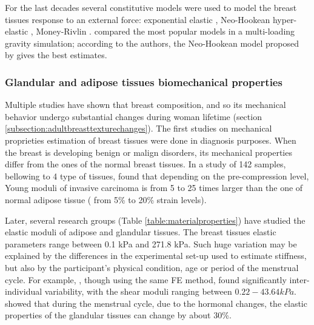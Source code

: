 For the last decades several constitutive models were used to model the breast tissues response to an external force: exponential elastic \citep{azar_methods_2002}, Neo-Hookean hyper-elastic \citep{carter_biomechanical_2009,rajagopal_modeling_2010,sturgeon_finite_element_2016, eiben_breast_2016, han_nonlinear_2014, garcia_mapping_2017}, Money-Rivlin \citep{samani_elastic_2007,tanner_factors_2006,carter_application_2012,martinez_finite_2017}. \cite{eder_comparison_2014} compared the most popular models in a multi-loading gravity simulation; according to the authors, the Neo-Hookean model proposed by \cite{rajagopal_creating_2008} gives the best estimates.

\subsubsection*{Glandular and adipose tissues biomechanical properties }
 Multiple studies have shown that breast composition, and so its mechanical behavior undergo substantial changes during woman lifetime (section \ref{subsection:adultbreasttexturechanges}). The first studies on mechanical proprieties estimation of breast tissues were done in diagnosis purposes. When the breast is developing benign or malign disorders, its mechanical properties differ from the ones of the normal breast tissues.  In a study of 142 samples, bellowing to 4 type of tissues, \cite{krouskop_elastic_1998} found that depending on the pre-compression level, Young moduli of invasive carcinoma is from 5 to 25 times larger than the one of normal adipose tissue  ( from 5\% to 20\% strain levels).  

Later, several research groups (Table \ref{table:materialproperties}) have studied the elastic moduli of adipose and glandular tissues. The breast tissues elastic parameters range between 0.1 kPa and 271.8 kPa. Such huge variation may be explained by the differences in the experimental set-up used to estimate stiffness, but also by the participant's physical condition, age or period of the menstrual cycle. For example, \cite{han_development_2012}, though using the same FE method, found significantly inter-individual variability, with the shear moduli ranging between $0.22-43.64 kPa$. \cite{lorenzen_menstrual-cycle_2003} showed that during the menstrual cycle, due to the hormonal changes, the elastic properties of the glandular tissues can change by about 30\%.

